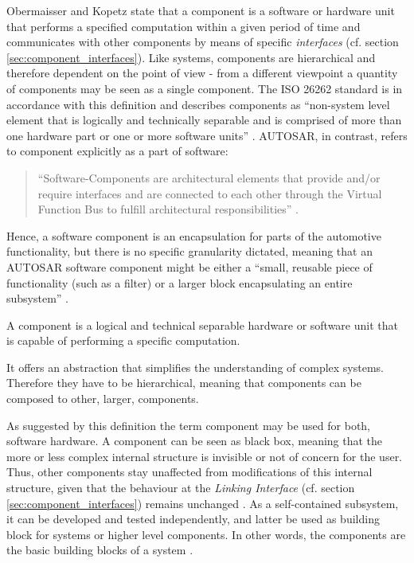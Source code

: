 Obermaisser and Kopetz state that a component is a software or hardware unit that performs a specified computation within a given period of time \cite[p.38]{genesys} and communicates with other components by means of specific \emph{interfaces} (cf. section \ref{sec:component_interfaces}). Like systems, components are hierarchical and therefore dependent on the point of view - from a different viewpoint a quantity of components may be seen as a single component. The ISO 26262 standard is in accordance with this definition and describes components as ``non-system level element that is logically and technically separable and is comprised of more than one hardware part or one or more software units'' \cite{iso26262:1}.
AUTOSAR, in contrast, refers to component explicitly as a part of software:	
\begin{quote}
``Software-Components are architectural elements that provide and/or require interfaces and are connected to each other through the Virtual Function Bus to fulfill architectural responsibilities'' \cite{autosar_glossary}.
\end{quote}
Hence, a software component is an encapsulation for parts of the automotive functionality, but there is no specific granularity dictated, meaning that an AUTOSAR software component might be either a ``small, reusable piece of functionality (such as a filter) or a larger block encapsulating an entire subsystem'' \cite{autosar}.

\begin{myquote}
A component is a logical and technical separable hardware or software unit that is capable of performing a specific computation.

It offers an abstraction that simplifies the understanding of complex systems. Therefore they have to be hierarchical, meaning that components can be composed to other, larger, components.
\end{myquote}

As suggested by this definition the term component may be used for both, software hardware. 
A component can be seen as black box, meaning that the more or less complex internal structure is invisible or not of concern for the user. Thus, other components stay unaffected from modifications of this internal structure, given that the behaviour at the \emph{Linking Interface} (cf. section \ref{sec:component_interfaces}) remains unchanged \cite[p.38-39]{genesys} \cite{autosar_intro} \cite{sametinger}. As a self-contained subsystem, it can be developed and tested independently, and latter be used as building block for systems or higher level components. In other words, the components are the basic building blocks of a system \cite{ning}. 

